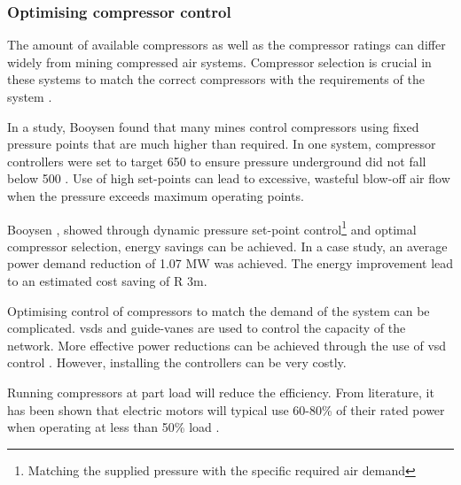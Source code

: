 		\subsubsection{Optimising compressor control}
		The amount of available compressors as well as the compressor ratings can differ widely from mining compressed air systems. Compressor selection is crucial in these systems to match the correct compressors with the requirements of the system \cite{marais2010expert}.
		\par 
		In a study, Booysen \cite{Booysen2012Masters} found that many mines control compressors using fixed pressure points that are much higher than required. In one system, compressor controllers were set to target 650  to ensure pressure underground did not fall below 500 . Use of high set-points can lead to excessive, wasteful blow-off air flow when the pressure exceeds maximum operating points.
		\par
		 Booysen \cite{booysen2009optimising}, showed through dynamic pressure set-point control\footnote{Matching the supplied pressure with the specific required air demand} and optimal compressor selection, energy savings can be achieved. In a case study, an average power demand reduction of 1.07 MW was achieved. The energy improvement lead to an estimated cost saving of R 3m.
		\par 
	 	Optimising control of compressors to match the demand of the system can be complicated. \glspl{vsd} and guide-vanes are used to control the capacity of the network. More effective power reductions can be achieved through the use of \gls{vsd} control \cite{Bredenkamp2013Masters}. However, installing the  controllers can be very costly.
	 	\par 
	 	 Running compressors at part load will reduce the efficiency. From literature, it has been shown that electric motors will typical use 60-80\% of their rated power when operating at less than 50\% load \cite{Saidur2010}.
